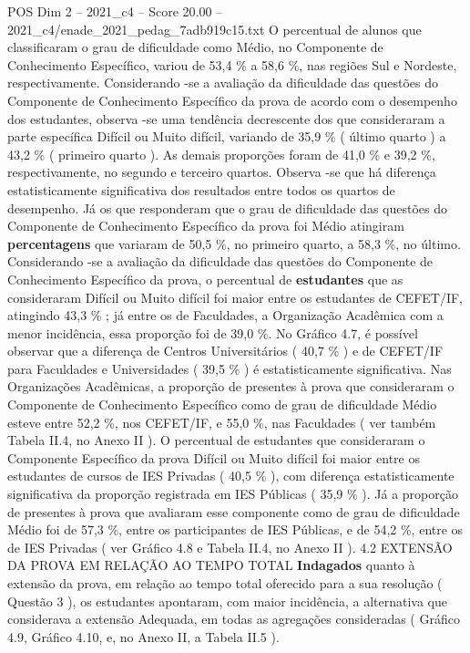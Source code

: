 \begin{textsample}{POS Dim 2 – 2021\_c4 – Score 20.00 – 2021\_c4/enade\_2021\_pedag\_7adb919c15.txt}
O percentual de alunos que classificaram o grau de dificuldade como Médio, no Componente de Conhecimento Específico, variou de 53,4 \% a 58,6 \%, nas regiões Sul e Nordeste, respectivamente.
Considerando -se a avaliação da dificuldade das questões do Componente de Conhecimento Específico da prova de acordo com o desempenho dos estudantes, observa -se uma tendência decrescente dos que consideraram a parte específica Difícil ou Muito difícil, variando de 35,9 \% ( último quarto ) a 43,2 \% ( primeiro quarto ).
As demais proporções foram de 41,0 \% e 39,2 \%, respectivamente, no segundo e terceiro quartos.
Observa -se que há diferença estatisticamente significativa dos resultados entre todos os quartos de desempenho.
Já os que responderam que o grau de dificuldade das questões do Componente de Conhecimento Específico da prova foi Médio atingiram \textbf{percentagens} que variaram de 50,5 \%, no primeiro quarto, a 58,3 \%, no último.
Considerando -se a avaliação da dificuldade das questões do Componente de Conhecimento Específico da prova, o percentual de \textbf{estudantes} que as consideraram Difícil ou Muito difícil foi maior entre os estudantes de CEFET/IF, atingindo 43,3 \% ; já entre os de Faculdades, a Organização Acadêmica com a menor incidência, essa proporção foi de 39,0 \%.
No Gráfico 4.7, é possível observar que a diferença de Centros Universitários ( 40,7 \% ) e de CEFET/IF para Faculdades e Universidades ( 39,5 \% ) é estatisticamente significativa.
Nas Organizações Acadêmicas, a proporção de presentes à prova que consideraram o Componente de Conhecimento Específico como de grau de dificuldade Médio esteve entre 52,2 \%, nos CEFET/IF, e 55,0 \%, nas Faculdades ( ver também Tabela II.4, no Anexo II ).
O percentual de estudantes que consideraram o Componente Específico da prova Difícil ou Muito difícil foi maior entre os estudantes de cursos de IES Privadas ( 40,5 \% ), com diferença estatisticamente significativa da proporção registrada em IES Públicas ( 35,9 \% ).
Já a proporção de presentes à prova que avaliaram esse componente como de grau de dificuldade Médio foi de 57,3 \%, entre os participantes de IES Públicas, e de 54,2 \%, entre os de IES Privadas ( ver Gráfico 4.8 e Tabela II.4, no Anexo II ). 4.2 EXTENSÃO DA PROVA EM RELAÇÃO AO TEMPO TOTAL \textbf{Indagados} quanto à extensão da prova, em relação ao tempo total oferecido para a sua resolução ( Questão 3 ), os estudantes apontaram, com maior incidência, a alternativa que considerava a extensão Adequada, em todas as agregações consideradas ( Gráfico 4.9, Gráfico 4.10, e, no Anexo II, a Tabela II.5 ).

\end{textsample}
